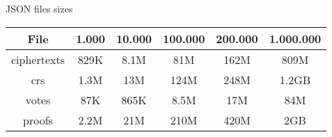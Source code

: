 \documentclass{standalone}
\begin{document}
\begin{threeparttable}
\caption{JSON files sizes}
\label{table:files}
\begin{tabular}{ |c||c|c|c|c|c| }
\hline
\textbf{File} & \textbf{1.000} & \textbf{10.000} & \textbf{100.000} & \textbf{200.000} & \textbf{1.000.000} \\
\hline
ciphertexts & 829K & 8.1M & 81M & 162M & 809M \\
crs & 1.3M & 13M & 124M & 248M & 1.2GB \\
votes & 87K & 865K & 8.5M & 17M & 84M \\
proofs & 2.2M & 21M & 210M & 420M & 2GB \\
\hline
\end{tabular}
\begin{tablenotes}
\small
\item
\end{tablenotes}
\end{threeparttable}
\end{document}
